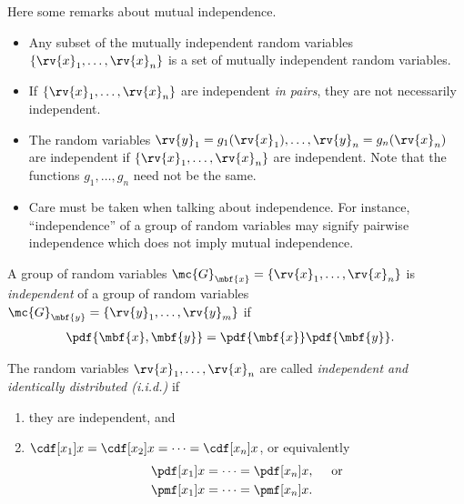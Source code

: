 \begin{remark}
    Here some remarks about mutual independence.
    \begin{itemize}
        \item Any subset of the mutually independent random variables $\left\{ \rv{x}_{1}, \ldots, \rv{x}_{n}\right\}$ is a set of mutually independent random variables. 
        \item If $\left\{ \rv{x}_{1},\ldots, \rv{x}_{n}\right\}$ are independent \emph{in pairs}, they are not necessarily independent.
        \item The random variables $\rv{y}_{1}=g_{1}(\rv{x}_{1}),\ldots,\rv{y}_{n}=g_{n}(\rv{x}_{n})$ are independent if $\left\{ \rv{x}_{1},\ldots, \rv{x}_{n}\right\}$ are independent. Note that the functions $g_{1}, \ldots, g_{n}$ need not be the same.
        \item Care must be taken when talking about independence. For instance, ``independence'' of a group of random variables may signify pairwise independence which does not imply mutual independence.
    \end{itemize}
\end{remark}

\begin{mydefinition}
    A group of random variables $\mc{G}_{\mbf{x}} = \left\{ \rv{x}_{1}, \ldots,\rv{x}_{n}\right\}$ is \emph{independent} of a group of random variables $\mc{G}_{\mbf{y}} = \left\{ \rv{y}_{1}, \ldots,\rv{y}_{m}\right\}$ if 
    \begin{align}
        \pdf{\mbf{x},\mbf{y}} &= \pdf{\mbf{x}}\pdf{\mbf{y}}.
    \end{align}
\end{mydefinition}

\begin{mydefinition}
    The random variables $\rv{x}_{1}, \ldots, \rv{x}_{n}$ are called \emph{independent and identically distributed (i.i.d.)} if 
    \begin{enumerate}
        \item they are independent, and
        \item $\cdf[x_{1}]{x} = \cdf[x_{2}]{x} = \cdots = \cdf[x_{n}]{x}$, or equivalently
        \begin{align}
            \pdf[x_{1}]{x} &= \cdots = \pdf[x_{n}]{x}, \quad \text{ or}\\
            \pmf[x_{1}]{x} &= \cdots = \pmf[x_{n}]{x}.           
        \end{align}
    \end{enumerate}
\end{mydefinition}

